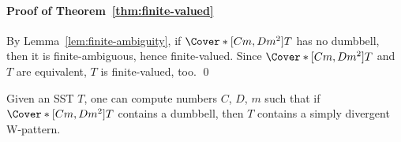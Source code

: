 \documentclass{article}
\begin{document}
\paragraph{Proof of Theorem~\ref{thm:finite-valued}}
By Lemma~\ref{lem:finite-ambiguity}, 
if $\Cover*[Cm,Dm^2]{T}$ has no dumbbell,
then it is finite-ambiguous, hence %
finite-valued.
Since $\Cover*[Cm,Dm^2]{T}$  and $T$ are equivalent,
$T$ is finite-valued, too.
\qed


\begin{lemma}\label{lem:unbounded-values3}
Given an SST $T$, one can compute  numbers $C$, $D$, $m$ such that
if $\Cover*[Cm,Dm^2]{T}$ contains a dumbbell, then $T$ contains a 
simply divergent W-pattern.
\end{lemma}
\end{document}
